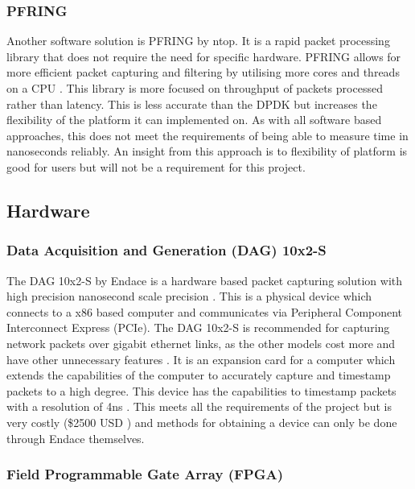 \subsubsection{PF\textunderscore RING}

Another software solution is PF\textunderscore RING by ntop\texttrademark. 
It is a rapid packet processing library that does not require the need for specific hardware.  
PF\textunderscore RING allows for more efficient packet capturing and filtering by utilising more cores and threads on a CPU \cite{pfringworks}.
This library is more focused on throughput of packets processed rather than latency. 
This is less accurate than the DPDK but increases the flexibility of the platform it can implemented on. 
As with all software based approaches, this does not meet the requirements of being able to measure time in nanoseconds reliably.
An insight from this approach is to flexibility of platform is good for users but will not be a requirement for this project.

\subsection{Hardware}

\subsubsection{Data Acquisition and Generation (DAG) 10x2-S}

\par The DAG 10x2-S by Endace is a hardware based packet capturing solution with high precision nanosecond scale precision \cite{dagprecision}. 
This is a physical device which connects to a x86 based computer and communicates via Peripheral Component Interconnect Express (PCIe). 
The DAG 10x2-S is recommended for capturing network packets over gigabit ethernet links, as the other models cost more and have other unnecessary features \cite{dagfeatures}.
It is an expansion card for a computer which extends the capabilities of the computer to accurately capture and timestamp packets to a high degree. 
This device has the capabilities to timestamp packets with a resolution of 4ns \cite{dagprecision}. 
This meets all the requirements of the project but is very costly (\$2500 USD \cite{dagprice}) and methods for obtaining a device can only be done through Endace themselves. 

\subsubsection{Field Programmable Gate Array (FPGA)}

